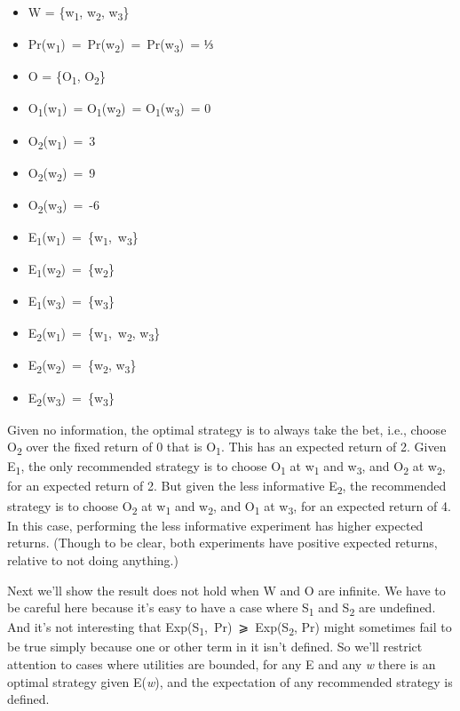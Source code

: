 \documentclass[
  10pt,
  letterpaper,
  DIV=11,
  numbers=noendperiod,
  twoside]{scrartcl}
\providecommand{\tightlist}{%
  \setlength{\itemsep}{0pt}\setlength{\parskip}{0pt}}\usepackage{longtable,booktabs,array}
\begin{document}
\begin{itemize}
\tightlist
\item
  W = \{w\textsubscript{1}, w\textsubscript{2}, w\textsubscript{3}\}
\item
  Pr(w\textsubscript{1})~=~Pr(w\textsubscript{2})~=~Pr(w\textsubscript{3})~=
  ⅓
\item
  O = \{O\textsubscript{1}, O\textsubscript{2}\}
\item
  O\textsubscript{1}(w\textsubscript{1})~=
  O\textsubscript{1}(w\textsubscript{2})~=
  O\textsubscript{1}(w\textsubscript{3})~= 0
\item
  O\textsubscript{2}(w\textsubscript{1})~=~3
\item
  O\textsubscript{2}(w\textsubscript{2})~=~9
\item
  O\textsubscript{2}(w\textsubscript{3})~=~-6
\item
  E\textsubscript{1}(w\textsubscript{1})~=~\{w\textsubscript{1},~w\textsubscript{3}\}
\item
  E\textsubscript{1}(w\textsubscript{2})~=~\{w\textsubscript{2}\}
\item
  E\textsubscript{1}(w\textsubscript{3})~=~\{w\textsubscript{3}\}
\item
  E\textsubscript{2}(w\textsubscript{1})~=~\{w\textsubscript{1},~w\textsubscript{2},
  w\textsubscript{3}\}
\item
  E\textsubscript{2}(w\textsubscript{2})~=~\{w\textsubscript{2},
  w\textsubscript{3}\}
\item
  E\textsubscript{2}(w\textsubscript{3})~=~\{w\textsubscript{3}\}
\end{itemize}

Given no information, the optimal strategy is to always take the bet,
i.e., choose O\textsubscript{2} over the fixed return of 0 that is
O\textsubscript{1}. This has an expected return of 2. Given
E\textsubscript{1}, the only recommended strategy is to choose
O\textsubscript{1} at w\textsubscript{1} and w\textsubscript{3}, and
O\textsubscript{2} at w\textsubscript{2}, for an expected return of 2.
But given the less informative E\textsubscript{2}, the recommended
strategy is to choose O\textsubscript{2} at w\textsubscript{1} and
w\textsubscript{2}, and O\textsubscript{1} at w\textsubscript{3}, for an
expected return of 4. In this case, performing the less informative
experiment has higher expected returns. (Though to be clear, both
experiments have positive expected returns, relative to not doing
anything.)

Next we'll show the result does not hold when W and O are infinite. We
have to be careful here because it's easy to have a case where
S\textsubscript{1} and S\textsubscript{2} are undefined. And it's not
interesting that Exp(S\textsubscript{1},~Pr)~⩾~Exp(S\textsubscript{2},
Pr) might sometimes fail to be true simply because one or other term in
it isn't defined. So we'll restrict attention to cases where utilities
are bounded, for any E and any \emph{w} there is an optimal strategy
given E(\emph{w}), and the expectation of any recommended strategy is
defined.
\end{document}
